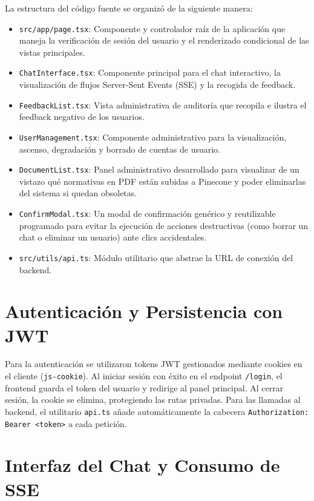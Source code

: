 \documentclass[12pt,a4paper,oneside]{report}
\begin{document}
La estructura del código fuente se organizó de la siguiente manera:
\begin{itemize}
    \item \texttt{src/app/page.tsx}: Componente y controlador raíz de la aplicación que maneja la verificación de sesión del usuario y el renderizado condicional de las vistas principales.
    \item \texttt{ChatInterface.tsx}: Componente principal para el chat interactivo, la visualización de flujos Server-Sent Events (SSE) y la recogida de feedback.
    \item \texttt{FeedbackList.tsx}: Vista administrativa de auditoría que recopila e ilustra el feedback negativo de los usuarios.
    \item \texttt{UserManagement.tsx}: Componente administrativo para la visualización, ascenso, degradación y borrado de cuentas de usuario.
    \item \texttt{DocumentList.tsx}: Panel administrativo desarrollado para visualizar de un vistazo qué normativas en PDF están subidas a Pinecone y poder eliminarlas del sistema si quedan obsoletas.
    \item \texttt{ConfirmModal.tsx}: Un modal de confirmación genérico y reutilizable programado para evitar la ejecución de acciones destructivas (como borrar un chat o eliminar un usuario) ante clics accidentales.
    \item \texttt{src/utils/api.ts}: Módulo utilitario que abstrae la URL de conexión del backend.
\end{itemize}

\section{Autenticación y Persistencia con JWT}

Para la autenticación se utilizaron tokens JWT gestionados mediante cookies en el cliente (\texttt{js-cookie}). Al iniciar sesión con éxito en el endpoint \texttt{/login}, el frontend guarda el token del usuario y redirige al panel principal. Al cerrar sesión, la cookie se elimina, protegiendo las rutas privadas. Para las llamadas al backend, el utilitario \texttt{api.ts} añade automáticamente la cabecera \texttt{Authorization: Bearer <token>} a cada petición.

\section{Interfaz del Chat y Consumo de SSE}
\end{document}
